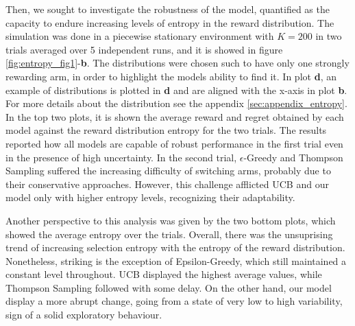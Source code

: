 \noindent Then, we sought to investigate the robustness of the model, quantified as the capacity to endure increasing levels of entropy in the reward distribution.
The simulation was done in a piecewise stationary environment with $K=200$ in two trials averaged over 5 independent runs, and it is showed in figure \ref{fig:entropy_fig1}-\textbf{b}.
The distributions were chosen such to have only one strongly rewarding arm, in order to highlight the models ability to find it.
In plot \textbf{d}, an example of distributions is plotted in \textbf{d} and are aligned with the x-axis in plot \textbf{b}.
For more details about the distribution see the appendix \ref{sec:appendix_entropy}.
In the top two plots, it is shown the average reward and regret obtained by each model against the reward distribution entropy for the two trials.
The results reported how all models are capable of robust performance in the first trial even in the presence of high uncertainty.
In the second trial, $\epsilon$-Greedy and Thompson Sampling suffered the increasing difficulty of switching arms, probably due to their conservative approaches. However, this challenge afflicted UCB and our model only with higher entropy levels, recognizing their adaptability.

Another perspective to this analysis was given by the two bottom plots, which showed the average entropy over the trials.
Overall, there was the unsuprising trend of increasing selection entropy with the entropy of the reward distribution. Nonetheless, striking is the exception of Epsilon-Greedy, which still maintained a constant level throughout.
UCB displayed the highest average values, while Thompson Sampling followed with some delay.
On the other hand, our model display a more abrupt change, going from a state of very low to high variability, sign of a solid exploratory behaviour.




